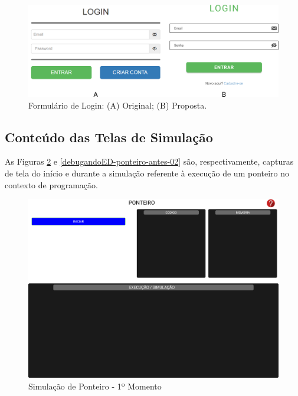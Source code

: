 \begin{figure}[htb]
    \begin{center}
	    \includegraphics[scale=0.35]{figs/debugandoED-form-login-antes-depois.png}
	\end{center}
    \caption{\label{debugandoED-form-login-antes-depois}Formulário de Login: (A) Original; (B) Proposta.}
\end{figure}

\subsection{Conteúdo das Telas de Simulação}
\label{Conteúdo das Telas de Simulação}

As Figuras \ref{debugandoED-ponteiro-antes-01} e \ref{debugandoED-ponteiro-antes-02} são, respectivamente, capturas de tela do início e durante a simulação referente à execução de um ponteiro no contexto de programação.

\begin{figure}[htb]
    \begin{center}
	    \includegraphics[scale=0.25]{figs/debugandoED-ponteiro-antes-01.png}
	\end{center}
    \caption{\label{debugandoED-ponteiro-antes-01}Simulação de Ponteiro - 1º Momento}
\end{figure}

